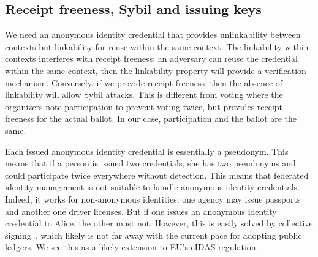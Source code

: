\subsection{Receipt freeness, Sybil and issuing keys}

We need an anonymous identity credential that provides unlinkability between 
contexts but linkability for reuse within the same context.
The linkability within contexts interferes with receipt freeness: an adversary 
can reuse the credential within the same context, then the linkability property 
will provide a verification mechanism.
Conversely, if we provide receipt freeness, then the absence of linkability 
will allow Sybil attacks.
This is different from voting where the organizers note participation to 
prevent voting twice, but provides receipt freeness for the actual ballot.
In our case, participation and the ballot are the same.

Each issued anonymous identity credential is essentially a pseudonym.
This means that if a person is issued two credentials, she has two pseudonyms 
and could participate twice everywhere without detection.
This means that federated identity-management is not suitable to handle 
anonymous identity credentials.
Indeed, it works for non-anonymous identities: one agency may issue passports 
and another one driver licenses.
But if one issues an anonymous identity credential to Alice, the other must 
not.
However, this is easily solved by collective signing~\cite{collective-signing}, 
which likely is not far away with the current pace for adopting public ledgers.
We see this as a likely extension to EU's eIDAS regulation.


%
%
%

